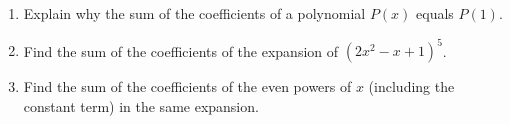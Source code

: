 \begin{enumerate}
\item[(a)] Explain why the sum of the coefficients of a polynomial $P(x)$ equals $P(1)$.
\item[(b)] Find the sum of the coefficients of the expansion of $\left(2x^2-x+1\right)^5$.
\item[(c)] Find the sum of the coefficients of the even powers of $x$ (including the constant term) in the same expansion.
\end{enumerate}
